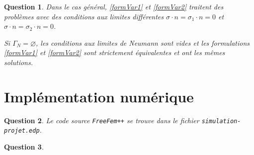 \documentclass{article}
\theoremstyle{plain}
\newtheorem{ques}{Question}
\begin{document}
\begin{ques}
    Dans le cas général, \eqref{formVar1} et \eqref{formVar2} traitent des problèmes avec des conditions aux limites différentes $\sigma \cdot n = \sigma_1\cdot n = 0$ et $\sigma\cdot n = \sigma_2\cdot n = 0$.

    Si $\Gamma_N = \varnothing$, les conditions aux limites de Neumann sont vides et les formulations \eqref{formVar1} et \eqref{formVar2} sont strictement équivalentes et ont les mêmes solutions.
\end{ques}

\section{Implémentation numérique}

\begin{ques}
    Le code source \verb|FreeFem++| se trouve dans le fichier \verb|simulation-projet.edp|.

    
\end{ques}

\begin{ques}
    
\end{ques}
\end{document}
